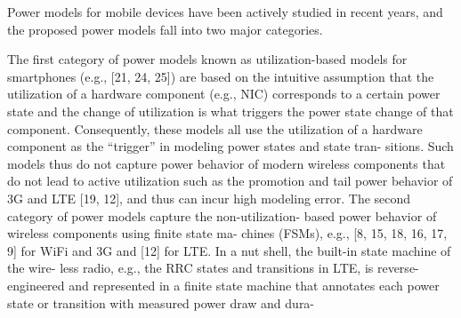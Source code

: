 
Power models for mobile devices have been actively studied in recent years, and the proposed power models fall into two major categories.

The first category of power models known as utilization-based models for smartphones (e.g., [21, 24, 25]) are based on the intuitive assumption that the utilization of a hardware component (e.g., NIC) corresponds to a certain power state and the change of utilization is what triggers the power state change of that component. Consequently, these models all use the utilization of a hardware component as the “trigger” in modeling power states and state tran- sitions. Such models thus do not capture power behavior of modern wireless components that do not lead to active utilization such as the promotion and tail power behavior of 3G and LTE [19, 12], and thus can incur high modeling error.
The second category of power models capture the non-utilization- based power behavior of wireless components using finite state ma- chines (FSMs), e.g., [8, 15, 18, 16, 17, 9] for WiFi and 3G and [12] for LTE. In a nut shell, the built-in state machine of the wire- less radio, e.g., the RRC states and transitions in LTE, is reverse- engineered and represented in a finite state machine that annotates each power state or transition with measured power draw and dura-
\fi




